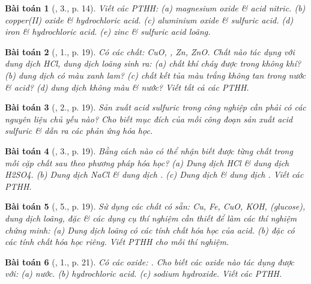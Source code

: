 \documentclass{article}
\newtheorem{baitoan}{Bài toán}
\begin{document}
\begin{baitoan}[\cite{SGK_Hoa_Hoc_9}, 3., p. 14]
	Viết các PTHH: (a) magnesium oxide \& acid nitric. (b) copper(II) oxide \& hydrochloric acid. (c) aluminium oxide \& sulfuric acid. (d) iron \& hydrochloric acid. (e) zinc \& sulfuric acid loãng.
\end{baitoan}

\begin{baitoan}[\cite{SGK_Hoa_Hoc_9}, 1., p. 19]
	Có các chất: \emph{CuO, , Zn, ZnO}. Chất nào tác dụng với dung dịch \emph{HCl}, dung dịch \emph{} loãng sinh ra: (a) chất khí cháy được trong không khí? (b) dung dịch có màu xanh lam? (c) chất kết tủa màu trắng không tan trong nước \& acid? (d) dung dịch không màu \& nước? Viết tất cả các PTHH.
\end{baitoan}

\begin{baitoan}[\cite{SGK_Hoa_Hoc_9}, 2., p. 19]
	Sản xuất acid sulfuric trong công nghiệp cần phải có các nguyên liệu chủ yếu nào? Cho biết mục đích của mỗi công đoạn sản xuất acid sulfuric \& dẫn ra các phản ứng hóa học.
\end{baitoan}

\begin{baitoan}[\cite{SGK_Hoa_Hoc_9}, 3., p. 19]
	Bằng cách nào có thể nhận biết được từng chất trong mỗi cặp chất sau theo phương pháp hóa học? (a) Dung dịch \emph{HCl} \& dung dịch \emph{H2SO4}. (b) Dung dịch \emph{NaCl} \& dung dịch \emph{}. (c) Dung dịch \emph{} \& dung dịch \emph{}. Viết các PTHH.
\end{baitoan}

\begin{baitoan}[\cite{SGK_Hoa_Hoc_9}, 5., p. 19]
	Sử dụng các chất có sẵn: \emph{Cu, Fe, CuO, KOH, } (glucose), dung dịch \emph{} loãng, \emph{} đặc \& các dụng cụ thí nghiệm cần thiết để làm các thí nghiệm chứng minh: (a) Dung dịch \emph{} loãng có các tính chất hóa học của acid. (b) \emph{} đặc có các tính chất hóa học riêng. Viết PTHH cho mỗi thí nghiệm.
\end{baitoan}

\begin{baitoan}[\cite{SGK_Hoa_Hoc_9}, 1., p. 21]
	Có các oxide: \emph{}. Cho biết các oxide nào tác dụng được với: (a) nước. (b) hydrochloric acid. (c) sodium hydroxide. Viết các PTHH.
\end{baitoan}
\end{document}
